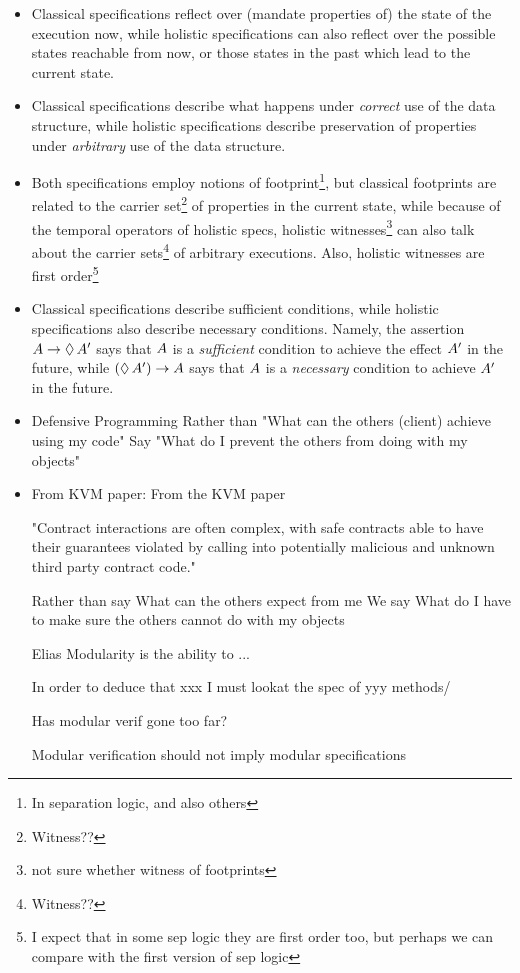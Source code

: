 \begin{itemize}
\item Classical specifications reflect over (\ie mandate properties of) the state of the execution now, while
holistic specifications can also reflect over the possible  states   reachable from now, or those states in the past
which lead to the current state.

\item Classical specifications describe what happens under {\em correct} use  of the data structure,
while holistic specifications  describe preservation of properties under {\em arbitrary} use  of the data structure.

\item Both specifications employ notions of footprint\footnote{In separation logic, and also others}, but
classical footprints are related to the carrier set\footnote{Witness??} of properties in the current state, while
because  of the temporal operators  of holistic specs, holistic witnesses\footnote{not sure whether witness of footprints}
 can  also talk about the carrier sets\footnote{Witness??} of arbitrary executions.
 Also, holistic witnesses are first order\footnote{I expect that in some sep logic they are first order too, but perhaps we
 can compare with the first version of sep logic}



\item Classical specifications describe sufficient conditions, while holistic specifications also describe necessary conditions. 
Namely, the assertion  $A \rightarrow \lozenge\, A'$ says that $A$ is a {\em sufficient} condition to achieve the
effect $A'$ in the future, while $(\lozenge\, A') \rightarrow A$ says that $A$ is a {\em necessary} condition to achieve $A'$ in the future.

\item Defensive Programming Rather than
      "What can the others (client) achieve using my code"
Say
     "What do I prevent the others from doing with my objects"

 \item
 From KVM paper: From the KVM paper

"Contract interactions are often complex, with safe contracts able to have their guarantees violated by calling into potentially malicious and unknown third party contract code."

Rather than say
    What can the others expect from me
We say
    What do I have to make sure the others cannot do with my objects

Elias
    Modularity is the ability to ...

    In order to deduce that xxx I must lookat the spec of yyy methods/

    Has modular verif gone too far?

Modular verification should not imply modular specifications

\end{itemize}


 

